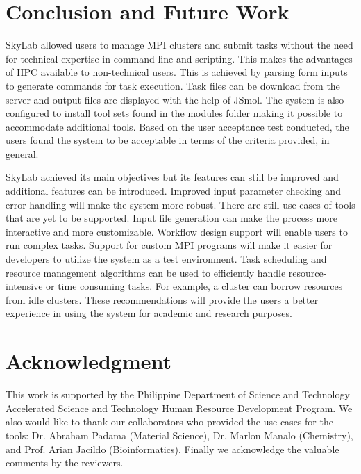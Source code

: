 \section{Conclusion and Future Work}
SkyLab allowed users to manage MPI clusters and submit tasks without the need for technical expertise in command line and scripting. This makes the advantages of HPC available to non-technical users. This is achieved by parsing form inputs to generate commands for task execution. Task files can be download from the server and output files are displayed with the help of JSmol. The system is also configured to install tool sets found in the modules folder making it possible to accommodate additional tools. Based on the user acceptance test conducted, the users found the system to be acceptable in terms of the criteria provided, in general. 

SkyLab achieved its main objectives but its features can still be improved and additional features can be introduced. Improved input parameter checking and error handling will make the system more robust. There are still use cases of tools that are yet to be supported. Input file generation can make the process more interactive and more customizable.  Workflow design support will enable users to run complex tasks. Support for custom MPI programs will make it easier for developers to utilize the system as a test environment. Task scheduling and resource management algorithms can be used to efficiently handle resource-intensive or time consuming tasks. For example, a cluster can borrow resources from idle clusters. These recommendations will provide the users a better experience in using the system for academic and research purposes. 




\section*{Acknowledgment}
This work is supported by the Philippine Department of Science and Technology Accelerated Science and Technology Human Resource Development Program. We also would like to thank our collaborators who provided the use cases for the tools: Dr. Abraham Padama (Material Science), Dr. Marlon Manalo (Chemistry), and Prof. Arian Jacildo (Bioinformatics). Finally we acknowledge the valuable comments by the reviewers.





